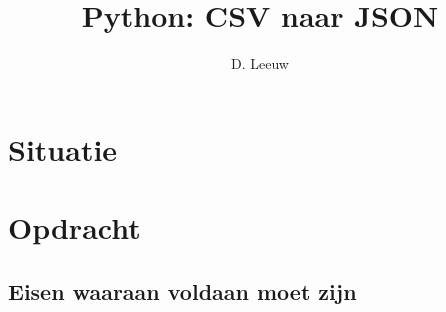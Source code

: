 \documentclass[a4paper,12pt,twoside,openright,titlepage]{article}
\author{D. Leeuw}
\title{Python: CSV naar JSON}
\date{\today\\
0.5.0\\
\vfill
\raggedright
\copyright\ 2026 Dennis Leeuw\\
}
\begin{document}

\maketitle



\section{Situatie}


\section{Opdracht}

\subsection{Eisen waaraan voldaan moet zijn}


\printindex
\end{document}
